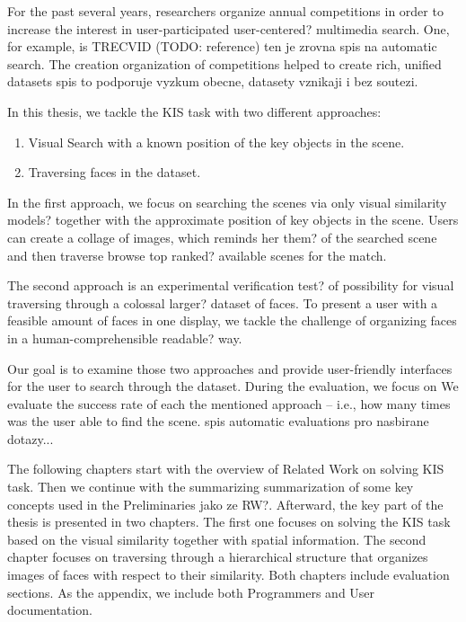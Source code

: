For the past several years, researchers organize annual competitions in order to increase the interest in user-participated {\color{red} user-centered?} multimedia search. One, for example, is TRECVID (TODO: reference) {\color{red} ten je zrovna spis na automatic search}. The creation {\color{red} organization} of competitions helped to create rich, unified datasets {\color{red} spis to podporuje vyzkum obecne, datasety vznikaji i bez soutezi}.

In this thesis, we tackle the KIS task with two different approaches: 
\begin{enumerate}
  \item Visual Search with a known position of the key objects in the scene.
  \item Traversing faces in the dataset.
\end{enumerate}

In the first approach, we focus on searching the scenes via only visual similarity {\color{red} models?} together with the approximate position of key objects in the scene. Users can create a collage of images, which remind{\color{red}s} her {\color{red} them?} of the {\color{red} searched} scene and then traverse {\color{red} browse top ranked?} available scenes for the match.

The second approach is {\color{red} an} experimental verification {\color{red} test? of} possibility for visual traversing through a colossal {\color{red} larger?} dataset of faces. To present a user with a feasible amount of faces in one display, we tackle the challenge of organizing faces in a human-comprehensible {\color{red} readable?} way.

Our goal is to examine those two approaches and provide user-friendly interfaces for the user to search through the dataset. During the evaluation, we focus on We evaluate the success rate of each the mentioned approach -- i.e., how many times was the user able to find the scene. {\color{red} spis automatic evaluations pro nasbirane dotazy...}

The following chapters start with the overview of Related Work on solving KIS task. Then we continue with the summarizing {\color{red} summarization of} some key concept{\color{red}s} used in the Preliminaries {\color{red} jako ze RW?}. Afterward, the key part of the thesis is presented in two chapters. The first one focuses on solving the KIS task based on the visual similarity together with spatial information. The second chapter focuses on traversing through {\color{red} a hierarchical structure that organizes images of} faces {\color{red} with respect to their similarity}. Both chapters include evaluation sections. As the appendix, we include both Programmers and User documentation.